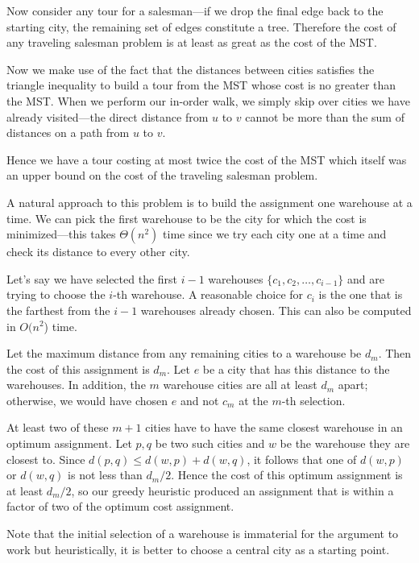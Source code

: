 Now consider any tour for a salesman---if we drop the final edge back 
to the starting city, the remaining set of edges constitute a tree.
Therefore the cost of any traveling salesman problem is at least as great as the cost of the MST.

Now we make use of the fact that the distances between cities satisfies
the triangle inequality to build a tour from the MST whose
cost is no greater than the MST. When we perform our in-order walk, 
we simply skip over cities we have already visited---the direct distance from
$u$ to $v$ cannot be more than the sum of distances on a path from $u$ to $v$.

Hence we have a tour costing at most twice the cost of the MST which itself
was an upper bound on the cost of the traveling salesman problem.

A natural approach to this problem is to build the assignment 
one warehouse at a time. We can pick the first warehouse to be the city
for which the cost is minimized---this takes $\Theta(n^2)$ time since we
try each city one at a time and check its distance to every other city.

Let's say we have selected the first $i-1$ warehouses $\{c_1,c_2,\ldots,c_{i-1}\}$
and are trying to
choose the $i$-th warehouse. A reasonable choice for $c_i$
is the one that is the farthest from the $i-1$ warehouses already chosen.
This can also be computed in $O(n^2$) time. 

Let the maximum distance from any remaining cities to a warehouse be $d_{m}$.
Then the cost of this assignment is $d_{m}$. Let $e$ be
a city that has this distance to the warehouses.
In addition, the $m$ warehouse cities are all at least $d_{m}$ apart; otherwise, we would have chosen $e$ and not $c_m$ at the $m$-th selection.

At least two of these $m+1$ cities have 
to have the same closest warehouse in an optimum assignment.
Let $p,q$ be two such cities and $w$ be the warehouse they are
closest to. Since $d(p,q) \leq d(w,p) + d(w,q)$, it follows
that one of $d(w,p)$ or $d(w,q)$ is not less than $d_m/2$.
Hence the cost of this optimum assignment is at least $d_m/2$, so
our greedy heuristic produced an assignment that is within a factor of 
two of the optimum cost assignment.

Note that the initial selection of a warehouse is immaterial for the 
argument to work but heuristically, it is better to choose 
a central city as a starting point.


